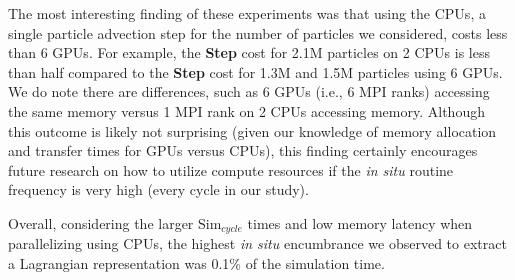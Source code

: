 The most interesting finding of these experiments was that using the CPUs, a single particle advection step for the number of particles we considered, costs less than 6 GPUs.
%
For example, the \textbf{Step} cost for 2.1M particles on 2 CPUs is less than half compared to the \textbf{Step} cost for 1.3M and 1.5M particles using 6 GPUs.
%
We do note there are differences, such as 6 GPUs (i.e., 6 MPI ranks) accessing the same memory versus 1 MPI rank on 2 CPUs accessing memory.
%
Although this outcome is likely not surprising (given our knowledge of memory allocation and transfer times for GPUs versus CPUs), this finding certainly encourages future research on how to utilize compute resources if the \textit{in situ} routine frequency is very high (every cycle in our study).
%

Overall, considering the larger Sim$_{cycle}$ times and low memory latency when parallelizing using CPUs, the highest \textit{in situ} encumbrance we observed to extract a Lagrangian representation was 0.1\% of the simulation time.
